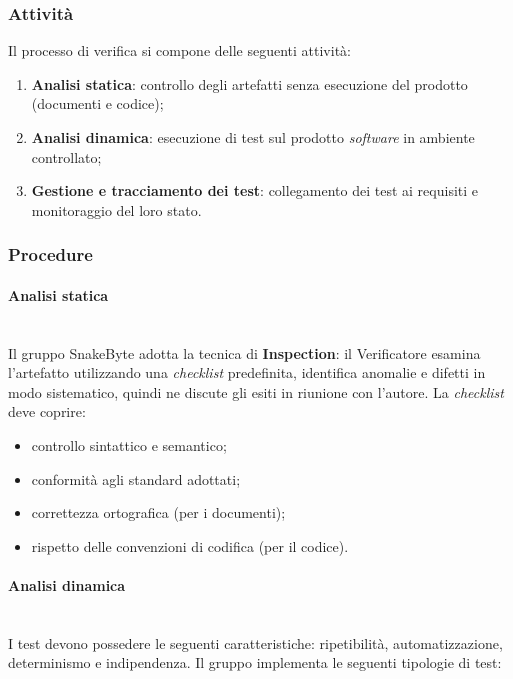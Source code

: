 \documentclass[10pt, letterpaper]{article}
\newcommand{\trisubsection}[1]{\paragraph{#1}\mbox{}\\}
\begin{document}
\subsubsection{Attività}
Il processo di verifica si compone delle seguenti attività:
\begin{enumerate}
    \item \textbf{Analisi statica}: controllo degli artefatti senza esecuzione del prodotto (documenti e codice);
    \item \textbf{Analisi dinamica}: esecuzione di test sul prodotto \textit{software} in ambiente controllato;
    \item \textbf{Gestione e tracciamento dei test}: collegamento dei test ai requisiti e monitoraggio del loro stato.
\end{enumerate}

\subsubsection{Procedure}

\trisubsection{Analisi statica}
Il gruppo SnakeByte adotta la tecnica di \textbf{Inspection}: il Verificatore esamina l'artefatto utilizzando una \textit{checklist} predefinita, identifica anomalie e difetti in modo sistematico, quindi ne discute gli esiti in riunione con l'autore. La \textit{checklist} deve coprire:
\begin{itemize}
    \item controllo sintattico e semantico;
    \item conformità agli standard adottati;
    \item correttezza ortografica (per i documenti);
    \item rispetto delle convenzioni di codifica (per il codice).
\end{itemize}

\trisubsection{Analisi dinamica}
I test devono possedere le seguenti caratteristiche: ripetibilità, automatizzazione, determinismo e indipendenza. Il gruppo implementa le seguenti tipologie di test:
\end{document}
